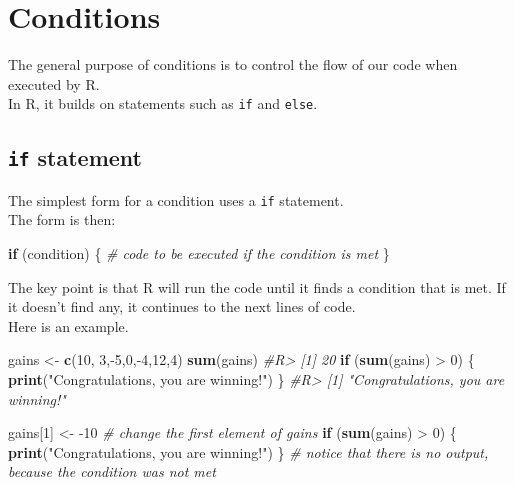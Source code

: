 \documentclass[]{book}
\newenvironment{Shaded}{}{}
\newcommand{\CommentTok}[1]{\textcolor[rgb]{0.38,0.63,0.69}{\textit{#1}}}
\newcommand{\ControlFlowTok}[1]{\textcolor[rgb]{0.00,0.44,0.13}{\textbf{#1}}}
\newcommand{\DecValTok}[1]{\textcolor[rgb]{0.25,0.63,0.44}{#1}}
\newcommand{\KeywordTok}[1]{\textcolor[rgb]{0.00,0.44,0.13}{\textbf{#1}}}
\newcommand{\NormalTok}[1]{#1}
\newcommand{\OperatorTok}[1]{\textcolor[rgb]{0.40,0.40,0.40}{#1}}
\newcommand{\StringTok}[1]{\textcolor[rgb]{0.25,0.44,0.63}{#1}}
\theoremstyle{definition}
\theoremstyle{definition}
\theoremstyle{definition}
\theoremstyle{remark}
\begin{document}
\hypertarget{conditions}{%
\chapter{Conditions}\label{conditions}}

The general purpose of conditions is to control the flow of our code
when executed by R.\\
In R, it builds on statements such as \texttt{if} and \texttt{else}.

\hypertarget{if-statement}{%
\section{\texorpdfstring{\texttt{if}
statement}{if statement}}\label{if-statement}}

The simplest form for a condition uses a \texttt{if} statement.\\
The form is then:

\begin{Shaded}
\begin{Highlighting}[]
\ControlFlowTok{if}\NormalTok{ (condition) \{}
\CommentTok{# code to be executed if the condition is met}
\NormalTok{\}}
\end{Highlighting}
\end{Shaded}

The key point is that R will run the code until it finds a condition
that is met. If it doesn't find any, it continues to the next lines of
code.\\
Here is an example.

\begin{Shaded}
\begin{Highlighting}[]
\NormalTok{gains <-}\StringTok{ }\KeywordTok{c}\NormalTok{(}\DecValTok{10}\NormalTok{, }\DecValTok{3}\NormalTok{,}\OperatorTok{-}\DecValTok{5}\NormalTok{,}\DecValTok{0}\NormalTok{,}\OperatorTok{-}\DecValTok{4}\NormalTok{,}\DecValTok{12}\NormalTok{,}\DecValTok{4}\NormalTok{)}
\KeywordTok{sum}\NormalTok{(gains)}
\CommentTok{#R> [1] 20}
\ControlFlowTok{if}\NormalTok{ (}\KeywordTok{sum}\NormalTok{(gains) }\OperatorTok{>}\StringTok{ }\DecValTok{0}\NormalTok{) \{}
  \KeywordTok{print}\NormalTok{(}\StringTok{"Congratulations, you are winning!"}\NormalTok{)}
\NormalTok{\}}
\CommentTok{#R> [1] "Congratulations, you are winning!"}

\NormalTok{gains[}\DecValTok{1}\NormalTok{] <-}\StringTok{ }\DecValTok{-10} \CommentTok{# change the first element of gains}
\ControlFlowTok{if}\NormalTok{ (}\KeywordTok{sum}\NormalTok{(gains) }\OperatorTok{>}\StringTok{ }\DecValTok{0}\NormalTok{) \{}
  \KeywordTok{print}\NormalTok{(}\StringTok{"Congratulations, you are winning!"}\NormalTok{)}
\NormalTok{\} }\CommentTok{# notice that there is no output, because the condition was not met}
\end{Highlighting}
\end{Shaded}
\end{document}
